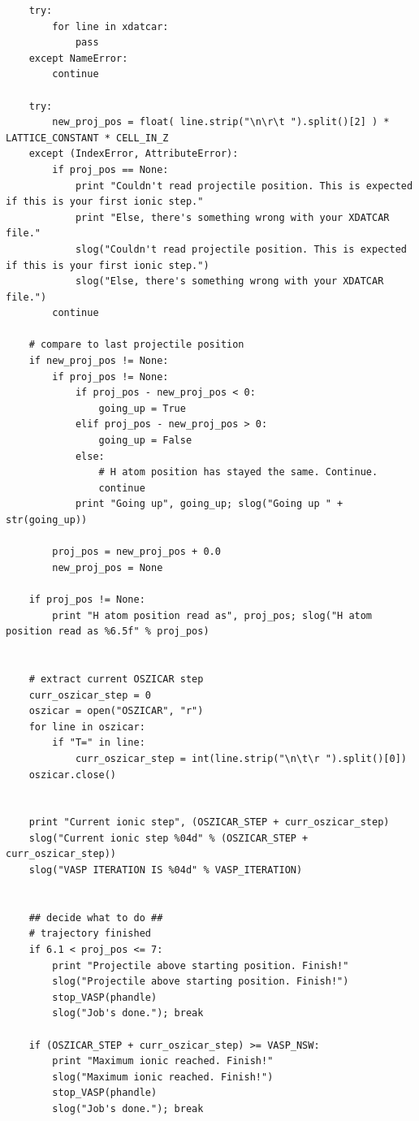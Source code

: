 \documentclass[twoside, 11pt, titlepage, captions=nooneline, a4paper, headsepline]{scrbook}%
\newcommand{\9}{\mathrm}
\newcommand{\0}{\,\mathrm}
\begin{document}
\begin{lstlisting}
    try:
        for line in xdatcar:
            pass
    except NameError:
        continue
    
    try:
        new_proj_pos = float( line.strip("\n\r\t ").split()[2] ) * LATTICE_CONSTANT * CELL_IN_Z
    except (IndexError, AttributeError):
        if proj_pos == None:
            print "Couldn't read projectile position. This is expected if this is your first ionic step."
            print "Else, there's something wrong with your XDATCAR file."
            slog("Couldn't read projectile position. This is expected if this is your first ionic step.")
            slog("Else, there's something wrong with your XDATCAR file.")
        continue
    
    # compare to last projectile position
    if new_proj_pos != None:
        if proj_pos != None:
            if proj_pos - new_proj_pos < 0:
                going_up = True
            elif proj_pos - new_proj_pos > 0:
                going_up = False
            else:
                # H atom position has stayed the same. Continue.
                continue
            print "Going up", going_up; slog("Going up " + str(going_up))
            
        proj_pos = new_proj_pos + 0.0
        new_proj_pos = None
        
    if proj_pos != None:
        print "H atom position read as", proj_pos; slog("H atom position read as %6.5f" % proj_pos) 
        

    # extract current OSZICAR step
    curr_oszicar_step = 0
    oszicar = open("OSZICAR", "r")
    for line in oszicar:
        if "T=" in line:
            curr_oszicar_step = int(line.strip("\n\t\r ").split()[0])
    oszicar.close()
    
    
    print "Current ionic step", (OSZICAR_STEP + curr_oszicar_step)
    slog("Current ionic step %04d" % (OSZICAR_STEP + curr_oszicar_step))
    slog("VASP ITERATION IS %04d" % VASP_ITERATION)


    ## decide what to do ##
    # trajectory finished
    if 6.1 < proj_pos <= 7:
        print "Projectile above starting position. Finish!"
        slog("Projectile above starting position. Finish!")
        stop_VASP(phandle)
        slog("Job's done."); break
        
    if (OSZICAR_STEP + curr_oszicar_step) >= VASP_NSW:
        print "Maximum ionic reached. Finish!"
        slog("Maximum ionic reached. Finish!")
        stop_VASP(phandle)
        slog("Job's done."); break


\end{lstlisting}
\end{document}
